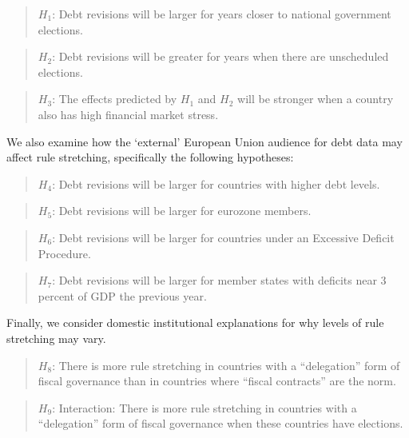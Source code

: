 \documentclass[]{article}
\begin{document}
\begin{quote}
    $H_{1}$: Debt revisions will be larger for years closer to national government elections.
\end{quote}

\begin{quote}
    $H_{2}$: Debt revisions will be greater for years when there are unscheduled elections.
\end{quote}

\begin{quote}
    $H_{3}$: The effects predicted by $H_{1}$ and $H_{2}$ will be stronger when a country also has high financial market stress.
\end{quote}

We also examine how the `external' European Union audience for debt data may affect rule stretching, specifically the following hypotheses:

\begin{quote}
    $H_{4}$: Debt revisions will be larger for countries with higher debt levels.
\end{quote}

\begin{quote}
    $H_{5}$: Debt revisions will be larger for eurozone members.
\end{quote}

\begin{quote}
    $H_{6}$: Debt revisions will be larger for countries under an Excessive Deficit Procedure.
\end{quote}

\begin{quote}
    $H_{7}$: Debt revisions will be larger for member states with deficits near 3 percent of GDP the previous year.
\end{quote}

Finally, we consider domestic institutional explanations for why levels of rule stretching may vary.

\begin{quote}
    $H_{8}$: There is more rule stretching in countries with a ``delegation'' form of fiscal governance than in countries where ``fiscal contracts'' are the norm.
\end{quote}

\begin{quote}
 	$H_{9}$: Interaction: There is more rule stretching in countries with a ``delegation'' form of fiscal governance when these countries have elections.
\end{quote}
\end{document}
